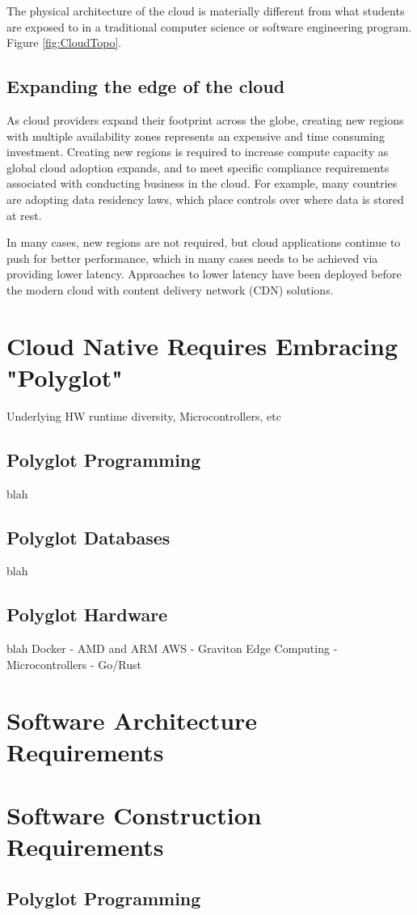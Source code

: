 \documentclass[conference]{IEEEconf}
\begin{document}
The physical architecture of the cloud is materially different from what students are exposed to in a traditional computer science or software engineering program.  Figure \ref{fig:CloudTopo}.

\subsection{Expanding the edge of the cloud}
As cloud providers expand their footprint across the globe, creating new regions with multiple availability zones represents an expensive and time consuming investment. Creating new regions is required to increase compute capacity as global cloud adoption expands, and to meet specific compliance requirements associated with conducting business in the cloud. For example, many countries are adopting data residency laws, which place controls over where data is stored at rest. 

In many cases, new regions are not required, but cloud applications continue to push for better performance, which in many cases needs to be achieved via providing lower latency.  Approaches to lower latency have been deployed before the modern cloud with content delivery network (CDN)\cite{CDN} solutions. 

\section{Cloud Native Requires Embracing "Polyglot"}
Underlying HW runtime diversity, Microcontrollers, etc
\subsection{Polyglot Programming}
blah

\subsection{Polyglot Databases}
blah

\subsection{Polyglot Hardware}
blah
Docker - AMD and ARM
AWS - Graviton
Edge Computing - Microcontrollers - Go/Rust


\section{Software Architecture Requirements}
\label{sec:SoftwareArchitecture}

\section{Software Construction Requirements}
\label{sec:SoftwareConstruction}

\subsection{Polyglot Programming}
\label{subsec:Polyglot}




\end{document}
